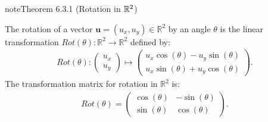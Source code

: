 \documentclass[letterpaper,10pt,english]{jupyterBook}
\begin{document}
\begin{sphinxadmonition}{note}{Theorem 6.3.1 (Rotation in \protect\(\mathbb{R}^2\protect\))}



\sphinxAtStartPar
The rotation of a vector \(\mathbf{u} = (u_x, u_y) \in \mathbb{R}^2\)  by an angle \(\theta\) is the linear transformation \(Rot(\theta): \mathbb{R}^2 \to \mathbb{R}^2\) defined by:
\begin{equation*}
\begin{split} Rot(\theta) :
    \begin{pmatrix} u_x \\ u_y \end{pmatrix} \mapsto
    \begin{pmatrix} u_x \cos(\theta) - u_y \sin(\theta) \\ u_x \sin(\theta) + u_y \cos(\theta) \end{pmatrix}. \end{split}
\end{equation*}
\sphinxAtStartPar
The transformation matrix for rotation in \(\mathbb{R}^2\) is:
\begin{equation}\label{equation:_pages/6.3_Rotation_reflection_and_translation:rotation-matrix-equation}
\begin{split} Rot(\theta) = \begin{pmatrix}
        \cos(\theta) & -\sin(\theta) \\
        \sin(\theta) & \cos(\theta)
    \end{pmatrix}. \end{split}
\end{equation}\end{sphinxadmonition}
\end{document}
